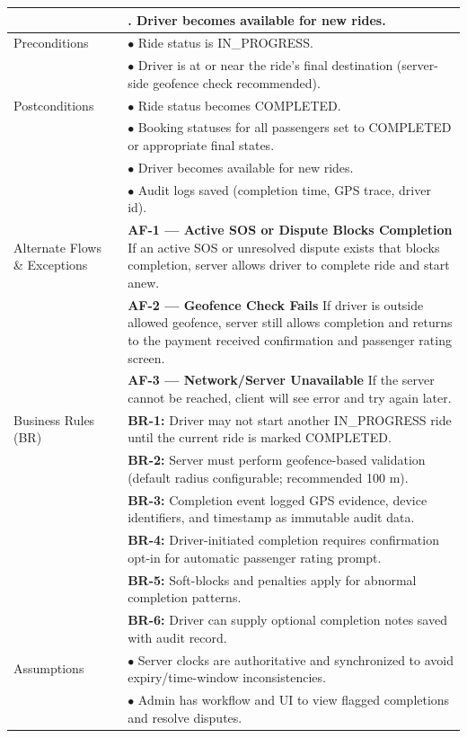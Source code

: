 \begin{longtable}{|>{\raggedright\arraybackslash}p{4cm}|>{\raggedright\arraybackslash}p{11cm}|}
& 8. Driver becomes available for new rides. \\
\hline
Preconditions & $\bullet$ Ride status is IN\_PROGRESS. \\
& $\bullet$ Driver is at or near the ride's final destination (server-side geofence check recommended). \\
\hline
Postconditions & $\bullet$ Ride status becomes COMPLETED. \\
& $\bullet$ Booking statuses for all passengers set to COMPLETED or appropriate final states. \\
& $\bullet$ Driver becomes available for new rides. \\
& $\bullet$ Audit logs saved (completion time, GPS trace, driver id). \\
\hline
Alternate Flows \& Exceptions & \textbf{AF-1 — Active SOS or Dispute Blocks Completion} \newline If an active SOS or unresolved dispute exists that blocks completion, server allows driver to complete ride and start anew. \\
& \textbf{AF-2 — Geofence Check Fails} \newline If driver is outside allowed geofence, server still allows completion and returns to the payment received confirmation and passenger rating screen. \\
& \textbf{AF-3 — Network/Server Unavailable} \newline If the server cannot be reached, client will see error and try again later. \\
\hline
Business Rules (BR) & \textbf{BR-1:} Driver may not start another IN\_PROGRESS ride until the current ride is marked COMPLETED. \\
& \textbf{BR-2:} Server must perform geofence-based validation (default radius configurable; recommended 100 m). \\
& \textbf{BR-3:} Completion event logged GPS evidence, device identifiers, and timestamp as immutable audit data. \\
& \textbf{BR-4:} Driver-initiated completion requires confirmation opt-in for automatic passenger rating prompt. \\
& \textbf{BR-5:} Soft-blocks and penalties apply for abnormal completion patterns. \\
& \textbf{BR-6:} Driver can supply optional completion notes saved with audit record. \\
\hline
Assumptions & $\bullet$ Server clocks are authoritative and synchronized to avoid expiry/time-window inconsistencies. \\
& $\bullet$ Admin has workflow and UI to view flagged completions and resolve disputes. \\
\hline
\end{longtable}
